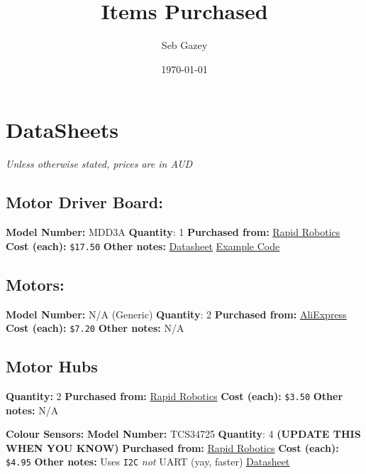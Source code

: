 \documentclass[11pt]{article}
\author{Seb Gazey}
\date{\today}
\title{Items Purchased}
\begin{document}
\maketitle
\tableofcontents

\section{DataSheets}
\label{sec:orgacdc4c6}
\begin{center}
\emph{Unless otherwise stated, prices are in AUD}
\end{center}
\subsection{Motor Driver Board:}
\label{sec:org4671e24}
\textbf{Model Number:} MDD3A
\textbf{Quantity}: 1
\textbf{Purchased from:} \href{https://rapidroboticsaustralia.com/collections/dc-motor-controllers/products/3amp-4v-16v-dc-motor-driver-2-channels}{Rapid Robotics}
\textbf{Cost (each):} \texttt{\$17.50}
\textbf{Other notes:}
\href{MDD3A Datasheet.pdf}{Datasheet}
\href{https://github.com/CytronTechnologies/CytronMotorDriver}{Example Code}
\subsection{Motors:}
\label{sec:orgb9dd445}
\textbf{Model Number:} N/A (Generic)
\textbf{Quantity}: 2
\textbf{Purchased from:} \href{https://www.aliexpress.com/item/4000406376595.html}{AliExpress}
\textbf{Cost (each):} \texttt{\$7.20}
\textbf{Other notes:}
N/A
\subsection{Motor Hubs}
\label{sec:orgfcc64d6}
\textbf{Quantity:} 2
\textbf{Purchased from:} \href{https://rapidroboticsaustralia.com/products/universal-motor-mounting-hub-6mm}{Rapid Robotics}
\textbf{Cost (each):} \texttt{\$3.50}
\textbf{Other notes:}
N/A

\textbf{Colour Sensors:}
\textbf{Model Number:} TCS34725
\textbf{Quantity}: 4 \textbf{(UPDATE THIS WHEN YOU KNOW)}
\textbf{Purchased from:} \href{https://rapidroboticsaustralia.com/products/tcs34725-color-recognition-sensor-module}{Rapid Robotics}
\textbf{Cost (each):} \texttt{\$4.95}
\textbf{Other notes:}
Uses \texttt{I2C} \emph{not} UART (yay, faster)
\href{https://cdn-shop.adafruit.com/datasheets/TCS34725.pdf}{Datasheet}
\end{document}
